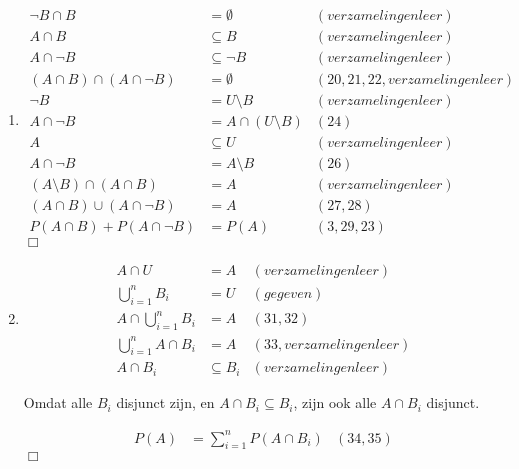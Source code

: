 \documentclass{article}
\begin{document}
\begin{enumerate}
\begin{enumerate}
            \item
                \begin{align}
                    \lnot B \cap B &= \emptyset & (verzamelingenleer)\\
                    A\cap B &\subseteq B & (verzamelingenleer)\\
                    A\cap \lnot B &\subseteq \lnot B & (verzamelingenleer)\\
                    (A\cap B) \cap (A \cap \lnot B) &= \emptyset  &(20, 21, 22,
                    verzamelingenleer)\\
                    \lnot B &= U\setminus B & (verzamelingenleer)\\
                    A\cap \lnot B &= A \cap (U\setminus B) & (24)\\
                    A &\subseteq U & (verzamelingenleer)\\
                    A\cap \lnot B &= A \setminus B & (26)\\
                    (A\setminus B) \cap (A\cap B) &= A & (verzamelingenleer)\\
                    (A\cap B) \cup (A \cap \lnot B) &=A & (27, 28)\\
                    P(A\cap B) + P(A \cap \lnot B) &= P(A) & (3, 29, 23)
                \end{align}
                $\Box$

            \item
                \begin{align}
                    A \cap U &= A & (verzamelingenleer)\\
                    \bigcup_{i=1}^n B_i &= U & (gegeven)\\
                    A \cap \bigcup_{i=1}^n B_i &= A & (31, 32)\\
                    \bigcup_{i=1}^n A \cap B_i &= A & (33, verzamelingenleer)\\
                    A \cap B_i &\subseteq B_i & (verzamelingenleer)
                \end{align}

                Omdat alle $B_i$ disjunct zijn, en $A \cap B_i \subseteq B_i$,
                zijn ook alle $A \cap B_i$ disjunct.

                \begin{align}
                    P(A) &= \sum_{i=1}^n P(A \cap B_i) & (34, 35)
                \end{align}
                $\Box$


\end{enumerate}
\end{enumerate}
\end{document}
